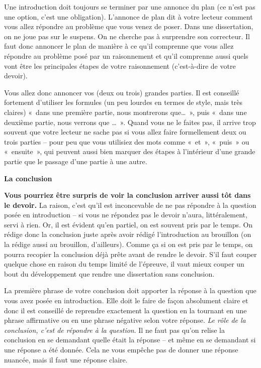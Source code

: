\documentclass[
  letterpaper,
  DIV=11,
  numbers=noendperiod]{scrartcl}
\begin{document}
Une introduction doit toujours se terminer par une annonce du plan (ce
n'est pas une option, c'est une obligation). L'annonce de plan dit à
votre lecteur comment vous allez répondre au problème que vous venez de
poser. Dans une dissertation, on ne joue pas sur le suspens. On ne
cherche pas à surprendre son correcteur. Il faut donc annoncer le plan
de manière à ce qu'il comprenne que vous allez répondre au problème posé
par un raisonnement et qu'il comprenne aussi quels vont être les
principales étapes de votre raisonnement (c'est-à-dire de votre devoir).

Vous allez donc annoncer vos (deux ou trois) grandes parties. Il est
conseillé fortement d'utiliser les formules (un peu lourdes en termes de
style, mais très claires) «~dans une première partie, nous montrerons
que\ldots~», puis «~dans une deuxième partie, nous verrons que \ldots~».
Quand vous ne le faites pas, il arrive trop souvent que votre lecteur ne
sache pas si vous allez faire formellement deux ou trois parties -- pour
peu que vous utilisiez des mots comme «~et~», «~puis~» ou «~ensuite~»,
qui peuvent aussi bien marquer des étapes à l'intérieur d'une grande
partie que le passage d'une partie à une autre.

\textbf{La conclusion}

\textbf{Vous pourriez être surpris de voir la conclusion arriver aussi
tôt dans le devoir.} La raison, c'est qu'il est inconcevable de ne pas
répondre à la question posée en introduction -- si vous ne répondez pas
le devoir n'aura, littéralement, servi à rien. Or, il est évident qu'en
partiel, on est souvent pris par le temps. On rédige donc la conclusion
juste après avoir rédigé l'introduction au brouillon (on la rédige aussi
au brouillon, d'ailleurs). Comme ça si on est pris par le temps, on
pourra recopier la conclusion déjà prête avant de rendre le devoir. S'il
faut couper quelque chose en raison du temps limité de l'épreuve, il
vaut mieux couper un bout du développement que rendre une dissertation
sans conclusion.

La première phrase de votre conclusion doit apporter la réponse à la
question que vous avez posée en introduction. Elle doit le faire de
façon absolument claire et donc il est conseillé de reprendre exactement
la question en la tournant en une phrase affirmative ou en une phrase
négative selon votre réponse. \emph{Le rôle de la conclusion, c'est de
répondre à la question}. Il ne faut pas qu'on relise la conclusion en se
demandant quelle était la réponse -- et même en se demandant si une
réponse a été donnée. Cela ne vous empêche pas de donner une réponse
nuancée, mais il faut une réponse claire.
\end{document}
